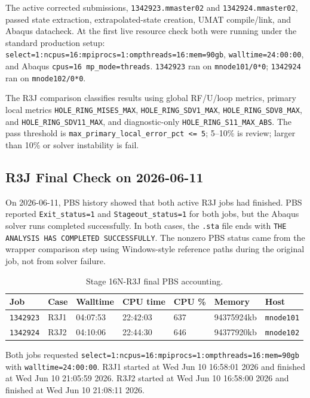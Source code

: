 \documentclass[11pt,a4paper]{article}
\newcommand{\code}[1]{\texttt{#1}}
\begin{document}
The active corrected submissions, \code{1342923.mmaster02} and \code{1342924.mmaster02}, passed state extraction, extrapolated-state creation, UMAT compile/link, and Abaqus datacheck. At the first live resource check both were running under the standard production setup: \code{select=1:ncpus=16:mpiprocs=1:ompthreads=16:mem=90gb}, \code{walltime=24:00:00}, and Abaqus \code{cpus=16 mp\_mode=threads}. \code{1342923} ran on \code{mnode101/0*0}; \code{1342924} ran on \code{mnode102/0*0}.

The R3J comparison classifies results using global RF/U/loop metrics, primary local metrics \code{HOLE\_RING\_MISES\_MAX}, \code{HOLE\_RING\_SDV1\_MAX}, \code{HOLE\_RING\_SDV8\_MAX}, and \code{HOLE\_RING\_SDV11\_MAX}, and diagnostic-only \code{HOLE\_RING\_S11\_MAX\_ABS}. The pass threshold is \code{max\_primary\_local\_error\_pct <= 5}; 5--10\% is review; larger than 10\% or solver instability is fail.

\subsection{R3J Final Check on 2026-06-11}

On 2026-06-11, PBS history showed that both active R3J jobs had finished. PBS reported \code{Exit\_status=1} and \code{Stageout\_status=1} for both jobs, but the Abaqus solver runs completed successfully. In both cases, the \code{.sta} file ends with \code{THE ANALYSIS HAS COMPLETED SUCCESSFULLY}. The nonzero PBS status came from the wrapper comparison step using Windows-style reference paths during the original job, not from solver failure.

\begin{table}[H]
\centering
\caption{Stage 16N-R3J final PBS accounting.}
\begin{tabular}{lllllll}
\toprule
Job & Case & Walltime & CPU time & CPU \% & Memory & Host \\
\midrule
\code{1342923} & R3J1 & 04:07:53 & 22:42:03 & 637 & 94375924kb & \code{mnode101} \\
\code{1342924} & R3J2 & 04:10:06 & 22:44:30 & 646 & 94377920kb & \code{mnode102} \\
\bottomrule
\end{tabular}
\end{table}

Both jobs requested \code{select=1:ncpus=16:mpiprocs=1:ompthreads=16:mem=90gb} with \code{walltime=24:00:00}. R3J1 started at Wed Jun 10 16:58:01 2026 and finished at Wed Jun 10 21:05:59 2026. R3J2 started at Wed Jun 10 16:58:00 2026 and finished at Wed Jun 10 21:08:11 2026.
\end{document}
